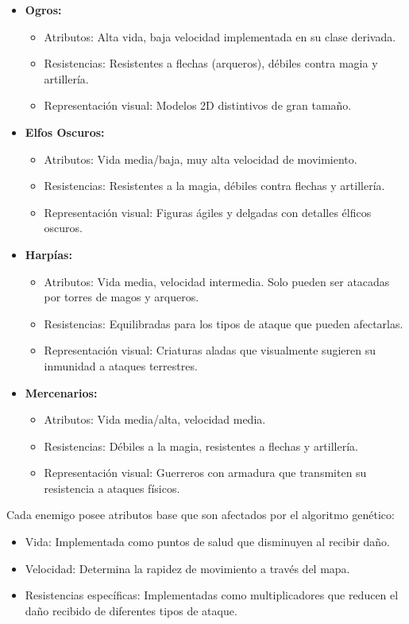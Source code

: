 \documentclass[a4paper,num-refs]{oup-contemporary}
\begin{document}
\begin{itemize}
    \item \textbf{Ogros:}
    \begin{itemize}
        \item Atributos: Alta vida, baja velocidad implementada en su clase derivada.
        \item Resistencias: Resistentes a flechas (arqueros), débiles contra magia y artillería.
        \item Representación visual: Modelos 2D distintivos de gran tamaño.
    \end{itemize}
    \item \textbf{Elfos Oscuros:}
    \begin{itemize}
        \item Atributos: Vida media/baja, muy alta velocidad de movimiento.
        \item Resistencias: Resistentes a la magia, débiles contra flechas y artillería.
        \item Representación visual: Figuras ágiles y delgadas con detalles élficos oscuros.
    \end{itemize}
    \item \textbf{Harpías:}
    \begin{itemize}
        \item Atributos: Vida media, velocidad intermedia. Solo pueden ser atacadas por torres de magos y arqueros.
        \item Resistencias: Equilibradas para los tipos de ataque que pueden afectarlas.
        \item Representación visual: Criaturas aladas que visualmente sugieren su inmunidad a ataques terrestres.
    \end{itemize}
    \item \textbf{Mercenarios:}
    \begin{itemize}
        \item Atributos: Vida media/alta, velocidad media.
        \item Resistencias: Débiles a la magia, resistentes a flechas y artillería.
        \item Representación visual: Guerreros con armadura que transmiten su resistencia a ataques físicos.
    \end{itemize}
\end{itemize}

Cada enemigo posee atributos base que son afectados por el algoritmo genético:
\begin{itemize}
    \item Vida: Implementada como puntos de salud que disminuyen al recibir daño.
    \item Velocidad: Determina la rapidez de movimiento a través del mapa.
    \item Resistencias específicas: Implementadas como multiplicadores que reducen el daño recibido de diferentes tipos de ataque.
\end{itemize}
\end{document}
